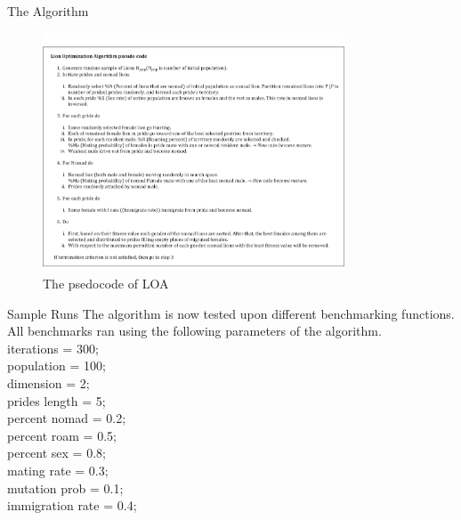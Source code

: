 \documentclass{beamer}
\begin{document}
\begin{frame}{The Algorithm}
\begin{figure}[H]
\begin{center}
\includegraphics[width=0.8\textwidth]{img/pseudocode}
\caption{The psedocode of LOA}
\end{center}
\end{figure}
\end{frame}

\begin{frame}{Sample Runs }
The algorithm is now tested upon different benchmarking functions. All benchmarks ran using the following parameters of the algorithm.\\
iterations = 300;\\

population = 100;\\

dimension = 2;\\

prides length = 5;\\

percent nomad = 0.2;\\
percent roam = 0.5;\\
percent sex = 0.8;\\

mating rate = 0.3;\\
mutation prob = 0.1;\\

immigration rate = 0.4;\\
\end{frame}
\end{document}
